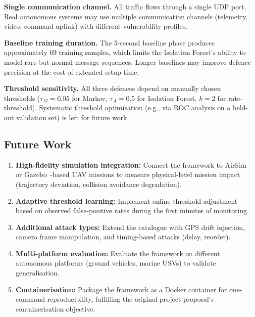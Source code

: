 \textbf{Single communication channel.}
All traffic flows through a single UDP port.
Real autonomous systems may use multiple communication channels (telemetry, video, command uplink) with different vulnerability profiles.

\textbf{Baseline training duration.}
The 5-second baseline phase produces approximately 69 training samples, which limits the Isolation Forest's ability to model rare-but-normal message sequences.
Longer baselines may improve defence precision at the cost of extended setup time.

\textbf{Threshold sensitivity.}
All three defences depend on manually chosen thresholds ($\tau_M = 0.05$ for Markov, $\tau_A = 0.5$ for Isolation Forest, $k = 2$ for rate-threshold).
Systematic threshold optimisation (e.g., via ROC analysis on a held-out validation set) is left for future work.

\subsection{Future Work}

\begin{enumerate}
    \item \textbf{High-fidelity simulation integration:} Connect the framework to AirSim~\cite{shah2018airsim} or Gazebo~\cite{koenig2004gazebo}-based UAV missions to measure physical-level mission impact (trajectory deviation, collision avoidance degradation).

    \item \textbf{Adaptive threshold learning:} Implement online threshold adjustment based on observed false-positive rates during the first minutes of monitoring.

    \item \textbf{Additional attack types:} Extend the catalogue with GPS drift injection, camera frame manipulation, and timing-based attacks (delay, reorder).

    \item \textbf{Multi-platform evaluation:} Evaluate the framework on different autonomous platforms (ground vehicles, marine USVs) to validate generalisation.

    \item \textbf{Containerisation:} Package the framework as a Docker container for one-command reproducibility, fulfilling the original project proposal's containerisation objective.
\end{enumerate}

